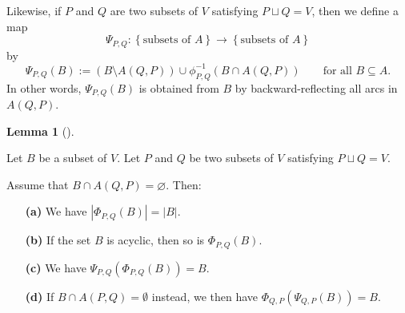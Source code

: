 \documentclass[numbers=enddot,12pt,final,onecolumn,notitlepage]{scrartcl}%
\theoremstyle{definition}
\newtheorem{lem}[theo]{Lemma}
\newenvironment{lemma}[1][]
{\begin{lem}[#1]\begin{leftbar}}
{\end{leftbar}\end{lem}}
\theoremstyle{plainsl}
\begin{document}
Likewise, if $P$ and $Q$ are two subsets of $V$ satisfying $P\sqcup Q=V$, then
we define a map%
\[
\Psi_{P,Q}:\left\{  \text{subsets of }A\right\}  \rightarrow\left\{
\text{subsets of }A\right\}
\]
by%
\[
\Psi_{P,Q}\left(  B\right)  :=\left(  B\setminus A\left(  Q,P\right)  \right)
\cup\phi_{P,Q}^{-1}\left(  B\cap A\left(  Q,P\right)  \right)  \qquad\text{for
all }B\subseteq A.
\]
In other words, $\Psi_{P,Q}\left(  B\right)  $ is obtained from $B$ by
backward-reflecting all arcs in $A\left(  Q,P\right)  $.

\begin{lemma}
\label{lem.realignment-acyc}Let $B$ be a subset of $V$. Let $P$ and $Q$ be two
subsets of $V$ satisfying $P\sqcup Q=V$.

Assume that $B\cap A\left(  Q,P\right)  =\varnothing$. Then:

\begin{enumerate}
\item[\textbf{(a)}] We have $\left\vert \Phi_{P,Q}\left(  B\right)
\right\vert =\left\vert B\right\vert $.

\item[\textbf{(b)}] If the set $B$ is acyclic, then so is $\Phi_{P,Q}\left(
B\right)  $.

\item[\textbf{(c)}] We have $\Psi_{P,Q}\left(  \Phi_{P,Q}\left(  B\right)
\right)  =B$.

\item[\textbf{(d)}] If $B \cap A(P,Q) = \emptyset$ instead, we then have
$\Phi_{Q,P}\left(  \Psi_{Q,P}\left(  B \right)  \right)  = B$.
\end{enumerate}
\end{lemma}
\end{document}
